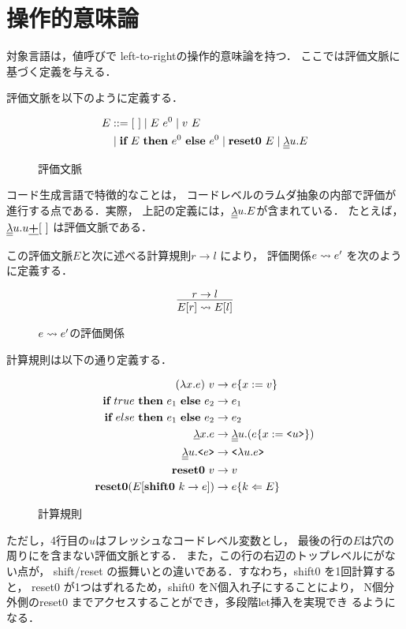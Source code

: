 \section{操作的意味論}

対象言語は，値呼びで left-to-rightの操作的意味論を持つ．
ここでは評価文脈に基づく定義を与える．

評価文脈を以下のように定義する．
\begin{figure}[!ht]
  \centering
  \begin{align*}
    E & ::= [~] \mid E~ e^0 \mid v~ E \\
      & \mid \textbf{if}~{E}~\textbf{then}~{e^0}~\textbf{else}~{e^0} \mid \textbf{reset0}~ E \mid \underline{\underline{\lambda}}{u}.{E}
  \end{align*}
  \caption{評価文脈}
\end{figure}

コード生成言語で特徴的なことは，
コードレベルのラムダ抽象の内部で評価が進行する点である．実際，
上記の定義には，$\underline{\underline{\lambda}}{u}.{E}$が含まれている．
たとえば，$\underline{\underline{\lambda}}{u}.{u \underline{\textbf{+}} [~]}$ は評価文脈である．

この評価文脈$E$と次に述べる計算規則$r \to l$ により，
評価関係$e \leadsto e'$ を次のように定義する．

\begin{figure}[!ht]
  \centering
  \[
    \infer{E[r] \lto E[l]}{r \to l}
  \]
  \caption{$e \leadsto e' $の評価関係}
  \label{fig:etoe}
\end{figure}


計算規則は以下の通り定義する．
\begin{figure}[!ht]
  \centering
  \begin{align*}
    (\lambda{x}.{e})~v &\to e\{ x := v \} \\
    \textbf{if}~{true}~\textbf{then}~{e_1}~\textbf{else}~{e_2} &\to e_1 \\
    \textbf{if}~{else}~\textbf{then}~{e_1}~\textbf{else}~{e_2} &\to e_2 \\
    \underline{\lambda}{x}.{e} &\to \underline{\underline{\lambda}}{u}.{(e\{ x := \texttt{<}{u}\texttt{>} \})} \\
    \underline{\underline{\lambda}}{u}.{\texttt{<}{e}\texttt{>}} &\to \texttt{<}{\lambda{u}.{e}}\texttt{>} \\
    \textbf{reset0}~ v &\to v \\
    \textbf{reset0} (E[\textbf{shift0}~ k \to e]) &\to e \{{k}\Leftarrow{E}\}
  \end{align*}
  \caption{計算規則}
  \label{fig:calc_rule}
\end{figure}

ただし，4行目の$u$はフレッシュなコードレベル変数とし，
最後の行の$E$は穴の周りに{\Resetz}を含まない評価文脈とする．
また，この行の右辺のトップレベルに{\Resetz}がない点が，
shift/reset の振舞いとの違いである．すなわち，shift0 を1回計算すると，
reset0 が1つはずれるため，shift0 をN個入れ子にすることにより，
N個分外側のreset0 までアクセスすることができ，多段階let挿入を実現でき
るようになる．

